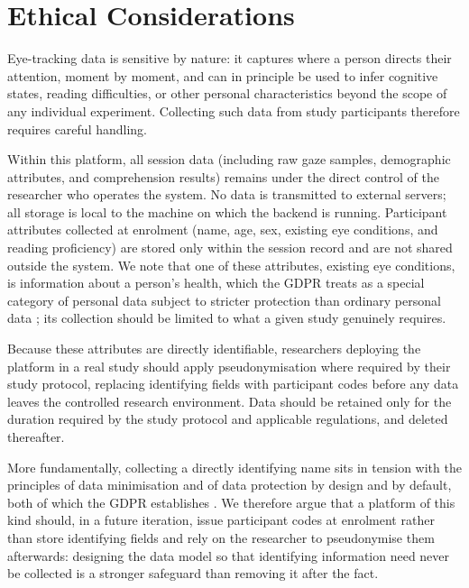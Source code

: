 \section{Ethical Considerations}
\label{sec:ethical-considerations}

Eye-tracking data is sensitive by nature: it captures where a person directs their attention, moment by moment, and can in principle be used to infer cognitive states, reading difficulties, or other personal characteristics beyond the scope of any individual experiment.
Collecting such data from study participants therefore requires careful handling.

Within this platform, all session data (including raw gaze samples, demographic attributes, and comprehension results) remains under the direct control of the researcher who operates the system.
No data is transmitted to external servers; all storage is local to the machine on which the backend is running.
Participant attributes collected at enrolment (name, age, sex, existing eye conditions, and reading proficiency) are stored only within the session record and are not shared outside the system.
We note that one of these attributes, existing eye conditions, is information about a person's health, which the GDPR treats as a special category of personal data subject to stricter protection than ordinary personal data \cite{gdpr2016}; its collection should be limited to what a given study genuinely requires.

Because these attributes are directly identifiable, researchers deploying the platform in a real study should apply pseudonymisation where required by their study protocol, replacing identifying fields with participant codes before any data leaves the controlled research environment.
Data should be retained only for the duration required by the study protocol and applicable regulations, and deleted thereafter.

More fundamentally, collecting a directly identifying name sits in tension with the principles of data minimisation and of data protection by design and by default, both of which the GDPR establishes \cite{gdpr2016}.
We therefore argue that a platform of this kind should, in a future iteration, issue participant codes at enrolment rather than store identifying fields and rely on the researcher to pseudonymise them afterwards: designing the data model so that identifying information need never be collected is a stronger safeguard than removing it after the fact.

